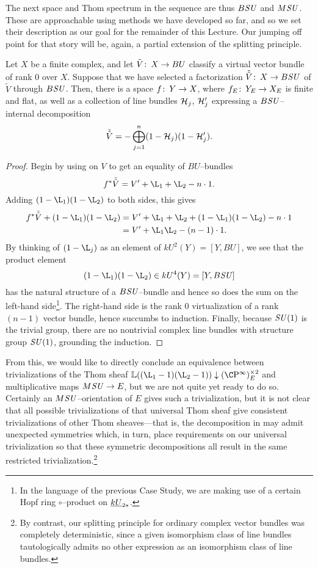 The next space and Thom spectrum in the sequence are thus \(B\mathit{SU}\) and \(M\mathit{SU}\).  These are approachable using methods we have developed so far, and so we set their description as our goal for the remainder of this Lecture.  Our jumping off point for that story will be, again, a partial extension of the splitting principle.
\begin{lemma}\label{SplittingPrincipleForBSU}
Let \(X\) be a finite complex, and let \(\tilde V\colon\thinspace X \to BU\) classify a virtual vector bundle of rank \(0\) over \(X\).  Suppose that we have selected a factorization \(\tilde{\tilde V}\colon\thinspace X \to B\mathit{SU}\) of \(\tilde V\) through \(B\mathit{SU}\).  Then, there is a space \(f\colon\thinspace Y \to X\), where \(f_E\colon\thinspace Y_E \to X_E\) is finite and flat, as well as a collection of line bundles \(\mathcal{H}_j\), \(\mathcal{H}'_j\) expressing a \(B\mathit{SU}\)--internal decomposition \[\tilde{\tilde V} = -\bigoplus_{j=1}^n (1 - \mathcal{H}_j)(1 - \mathcal{H}'_j).\]
\end{lemma}
\begin{proof}
Begin by using  on \(V\) to get an equality of \(BU\)--bundles \[f^* \tilde{\tilde V} = V' + \L_1 + \L_2 - n \cdot 1.\]  Adding \((1 - \L_1)(1 - \L_2)\) to both sides, this gives
\begin{align*}
f^* \tilde{\tilde V} + (1 - \L_1)(1 - \L_2) & = V' + \L_1 + \L_2 + (1 - \L_1)(1 - \L_2) - n \cdot 1 \\
& = V' + \L_1\L_2 - (n-1) \cdot 1.
\end{align*}
By thinking of \((1 - \L_j)\) as an element of \(kU^2(Y) = [Y, BU]\), we see that the product element \[(1 - \L_1)(1 - \L_2) \in kU^4(Y) = [Y, B\SU]\] has the natural structure of a \(B\mathit{SU}\)--bundle and hence so does the sum on the left-hand side\footnote{In the language of the previous Case Study, we are making use of a certain Hopf ring \(\circ\)--product on \(\OS{kU}{2*}\).}.  The right-hand side is the rank \(0\) virtualization of a rank \((n-1)\) vector bundle, hence succumbs to induction.  Finally, because \(\mathit{SU}(1)\) is the trivial group, there are no nontrivial complex line bundles with structure group \(\mathit{SU}(1)\), grounding the induction.
\end{proof}

From this, we would like to directly conclude an equivalence between trivializations of the Thom sheaf \(\ThomSheaf{(\L_1 - 1)(\L_2 - 1)} \downarrow (\CP^\infty)^{\times 2}_E\) and multiplicative maps \(M\mathit{SU} \to E\), but we are not quite yet ready to do so.  Certainly an \(M\mathit{SU}\)--orientation of \(E\) gives such a trivialization, but it is not clear that all possible trivializations of that universal Thom sheaf give consistent trivializations of other Thom sheaves---that is, the decomposition in  may admit unexpected symmetries which, in turn, place requirements on our universal trivialization so that these symmetric decompositions all result in the same restricted trivialization.\footnote{By contrast, our splitting principle for ordinary complex vector bundles was completely deterministic, since a given isomorphism class of line bundles tautologically admits no other expression as an isomorphism class of line bundles.}

